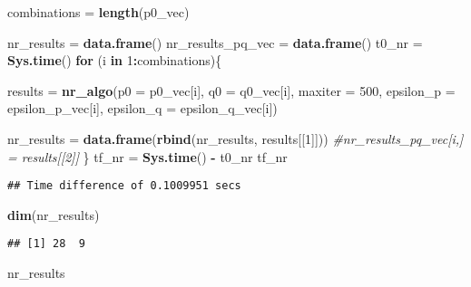 \documentclass[]{article}
\newenvironment{Shaded}{\begin{snugshade}}{\end{snugshade}}
\newcommand{\KeywordTok}[1]{\textcolor[rgb]{0.13,0.29,0.53}{\textbf{#1}}}
\newcommand{\DataTypeTok}[1]{\textcolor[rgb]{0.13,0.29,0.53}{#1}}
\newcommand{\DecValTok}[1]{\textcolor[rgb]{0.00,0.00,0.81}{#1}}
\newcommand{\StringTok}[1]{\textcolor[rgb]{0.31,0.60,0.02}{#1}}
\newcommand{\CommentTok}[1]{\textcolor[rgb]{0.56,0.35,0.01}{\textit{#1}}}
\newcommand{\ControlFlowTok}[1]{\textcolor[rgb]{0.13,0.29,0.53}{\textbf{#1}}}
\newcommand{\OperatorTok}[1]{\textcolor[rgb]{0.81,0.36,0.00}{\textbf{#1}}}
\newcommand{\NormalTok}[1]{#1}
\begin{document}
\begin{Shaded}
\begin{Highlighting}[]
\NormalTok{combinations =}\StringTok{ }\KeywordTok{length}\NormalTok{(p0_vec)}

\NormalTok{nr_results =}\StringTok{ }\KeywordTok{data.frame}\NormalTok{()}
\NormalTok{nr_results_pq_vec =}\StringTok{ }\KeywordTok{data.frame}\NormalTok{()}
\NormalTok{t0_nr =}\StringTok{ }\KeywordTok{Sys.time}\NormalTok{()}
\ControlFlowTok{for}\NormalTok{ (i }\ControlFlowTok{in} \DecValTok{1}\OperatorTok{:}\NormalTok{combinations)\{}
  
\NormalTok{  results =}\StringTok{ }\KeywordTok{nr_algo}\NormalTok{(}\DataTypeTok{p0 =}\NormalTok{ p0_vec[i],  }
                    \DataTypeTok{q0 =}\NormalTok{ q0_vec[i], }
                    \DataTypeTok{maxiter =} \DecValTok{500}\NormalTok{, }
                    \DataTypeTok{epsilon_p =}\NormalTok{ epsilon_p_vec[i],}
                    \DataTypeTok{epsilon_q =}\NormalTok{ epsilon_q_vec[i])}
  
\NormalTok{  nr_results =}\StringTok{ }\KeywordTok{data.frame}\NormalTok{(}\KeywordTok{rbind}\NormalTok{(nr_results, results[[}\DecValTok{1}\NormalTok{]]))}
  \CommentTok{#nr_results_pq_vec[i,] = results[[2]]}
\NormalTok{\}}
\NormalTok{tf_nr =}\StringTok{ }\KeywordTok{Sys.time}\NormalTok{() }\OperatorTok{-}\StringTok{ }\NormalTok{t0_nr}
\NormalTok{tf_nr}
\end{Highlighting}
\end{Shaded}

\begin{verbatim}
## Time difference of 0.1009951 secs
\end{verbatim}

\begin{Shaded}
\begin{Highlighting}[]
\KeywordTok{dim}\NormalTok{(nr_results)}
\end{Highlighting}
\end{Shaded}

\begin{verbatim}
## [1] 28  9
\end{verbatim}

\begin{Shaded}
\begin{Highlighting}[]
\NormalTok{nr_results}
\end{Highlighting}
\end{Shaded}
\end{document}
